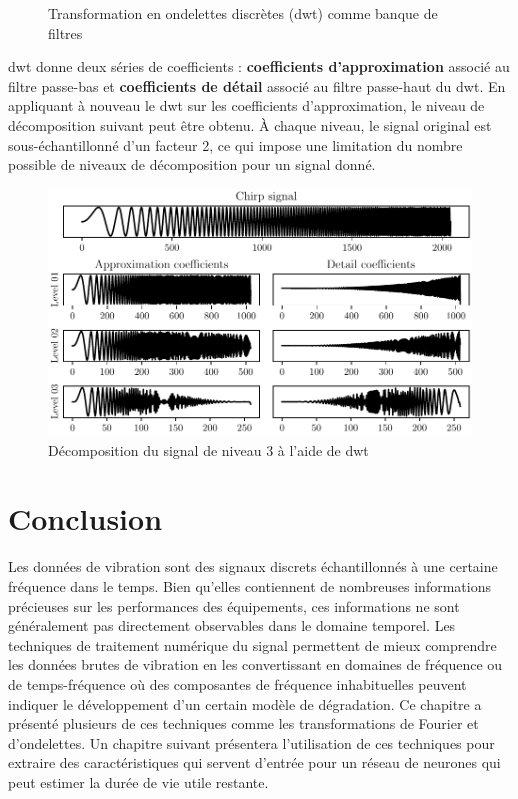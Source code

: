 \begin{figure}[H]
    \centering
    
    \caption{Transformation en ondelettes discrètes (\acrshort{dwt}) comme banque de filtres}
    \label{fig:dwt}
\end{figure}

\acrshort{dwt} donne deux séries de coefficients : \textbf{coefficients d'approximation} associé au filtre passe-bas et \textbf{coefficients de détail} associé au filtre passe-haut du \acrshort{dwt}. En appliquant à nouveau le \acrshort{dwt} sur les coefficients d'approximation, le niveau de décomposition suivant peut être obtenu. À chaque niveau, le signal original est sous-échantillonné d'un facteur 2, ce qui impose une limitation du nombre possible de niveaux de décomposition pour un signal donné.

\begin{figure}[H]
    \centering
    \includegraphics{figures/dwt_chirp.pdf}
    \caption{Décomposition du signal de niveau 3 à l'aide de \acrshort{dwt}}
    \label{fig:dwt-chirp-signal}
\end{figure}



\section{Conclusion}
Les données de vibration sont des signaux discrets échantillonnés à une certaine fréquence dans le temps. Bien qu'elles contiennent de nombreuses informations précieuses sur les performances des équipements, ces informations ne sont généralement pas directement observables dans le domaine temporel. Les techniques de traitement numérique du signal permettent de mieux comprendre les données brutes de vibration en les convertissant en domaines de fréquence ou de temps-fréquence où des composantes de fréquence inhabituelles peuvent indiquer le développement d'un certain modèle de dégradation. Ce chapitre a présenté plusieurs de ces techniques comme les transformations de Fourier et d'ondelettes. Un chapitre suivant présentera l'utilisation de ces techniques pour extraire des caractéristiques qui servent d'entrée pour un réseau de neurones qui peut estimer la durée de vie utile restante.







